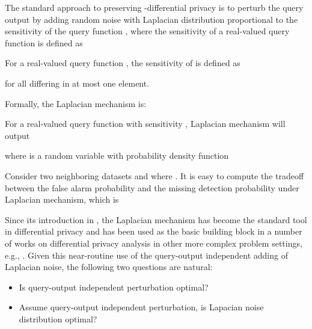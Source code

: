 The standard approach to preserving -differential privacy is to perturb the query output by adding random noise with Laplacian distribution proportional to the sensitivity  of the query function , where the  sensitivity of a real-valued query function is defined as

\begin{definition}
	For a real-valued query function , the sensitivity of  is defined as
	
for all  differing in at most one element.
\end{definition}


Formally, the  Laplacian mechanism is:
\begin{definition}
	For a real-valued query function  with sensitivity , Laplacian mechanism will output
	
 	where  is a random variable with probability density function
 	
\end{definition}





Consider two neighboring datasets  and  where . It is easy to compute the tradeoff between the false alarm probability  and the missing detection probability   under  Laplacian mechanism, which is











Since its introduction in \cite{DMNS06},  the Laplacian mechanism has become the standard tool in differential privacy and has been used as the basic building block in a number of works on differential privacy analysis in other more complex problem settings, e.g., \cite{HLM12, MM09, Xiao11, Huang12, McSherry10, Li10, Barak07, DKMMN06, DL09, Roth10, LO11, Smith2011, CM08, continual, Ding11, Hardt2010, Geo12, Ka11, Mironov12bit, Sarathy2011, Xiao2011ireduct, Dankar12, Friedman10, zhang2012functional, lei2011differentially, wasserman2010, dwork2010pan, Guptadp2010, blum2011fast, hsu2012distributed, hsu2012dp, blocki2012johnson, hardt2012beyond, hardt2012private, gupta2012iterative, kasi13, karwa2011private, cormode2012differentially}. Given this near-routine use of the query-output independent adding of Laplacian noise,  the following two questions are natural:
\begin{itemize}
	\item Is  query-output independent perturbation optimal?
	\item Assume query-output independent perturbation,  is Lapacian noise distribution optimal?
\end{itemize}

